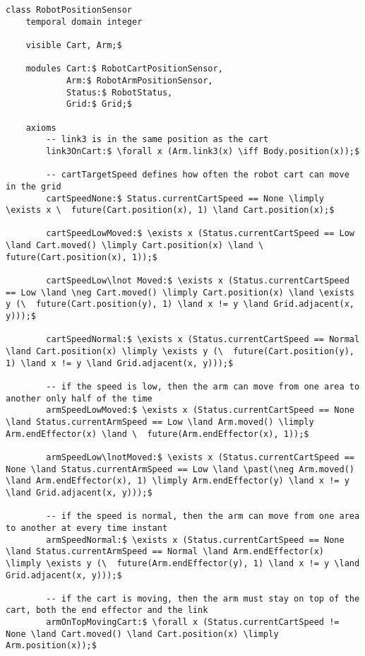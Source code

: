 \begin{lstlisting}[fontadjust, mathescape, frame=tlb] 
class RobotPositionSensor
    temporal domain integer

    visible Cart, Arm;$

    modules Cart:$ RobotCartPositionSensor,
            Arm:$ RobotArmPositionSensor,
            Status:$ RobotStatus,
            Grid:$ Grid;$

    axioms
        -- link3 is in the same position as the cart
        link3OnCart:$ \forall x (Arm.link3(x) \iff Body.position(x));$

        -- cartTargetSpeed defines how often the robot cart can move in the grid
        cartSpeedNone:$ Status.currentCartSpeed == None \limply \exists x \  future(Cart.position(x), 1) \land Cart.position(x);$

        cartSpeedLowMoved:$ \exists x (Status.currentCartSpeed == Low \land Cart.moved() \limply Cart.position(x) \land \  future(Cart.position(x), 1));$

        cartSpeedLow\lnot Moved:$ \exists x (Status.currentCartSpeed == Low \land \neg Cart.moved() \limply Cart.position(x) \land \exists y (\  future(Cart.position(y), 1) \land x != y \land Grid.adjacent(x, y)));$

        cartSpeedNormal:$ \exists x (Status.currentCartSpeed == Normal \land Cart.position(x) \limply \exists y (\  future(Cart.position(y), 1) \land x != y \land Grid.adjacent(x, y)));$

        -- if the speed is low, then the arm can move from one area to another only half of the time
        armSpeedLowMoved:$ \exists x (Status.currentCartSpeed == None \land Status.currentArmSpeed == Low \land Arm.moved() \limply Arm.endEffector(x) \land \  future(Arm.endEffector(x), 1));$

        armSpeedLow\lnotMoved:$ \exists x (Status.currentCartSpeed == None \land Status.currentArmSpeed == Low \land \past(\neg Arm.moved() \land Arm.endEffector(x), 1) \limply Arm.endEffector(y) \land x != y \land Grid.adjacent(x, y)));$

        -- if the speed is normal, then the arm can move from one area to another at every time instant
        armSpeedNormal:$ \exists x (Status.currentCartSpeed == None \land Status.currentArmSpeed == Normal \land Arm.endEffector(x) \limply \exists y (\  future(Arm.endEffector(y), 1) \land x != y \land Grid.adjacent(x, y)));$

        -- if the cart is moving, then the arm must stay on top of the cart, both the end effector and the link
        armOnTopMovingCart:$ \forall x (Status.currentCartSpeed != None \land Cart.moved() \land Cart.position(x) \limply Arm.position(x));$


\end{lstlisting}
